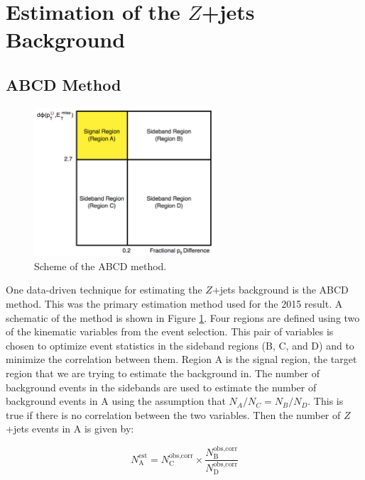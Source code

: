 \section{Estimation of the $Z$+jets Background}
\label{sec:zjets}

\subsection{ABCD Method}

\begin{figure}[htb]
\centering
\includegraphics[width=0.6\textwidth]{Figures/abcd2.png}
\caption{Scheme of the ABCD method.}
\label{fig:abcd}
\end{figure}

One data-driven technique for estimating the $Z$+jets background is the ABCD method. This was the primary estimation method used for the 2015 result. A schematic of the method is shown in Figure \ref{fig:abcd}. Four regions are defined using two of the kinematic variables from the event selection. This pair of variables is chosen to optimize event statistics in the sideband regions (B, C, and D) and to minimize the correlation between them. Region A is the signal region, the target region that we are trying to estimate the background in. The number of background events in the sidebands are used to estimate the number of background events in A using the assumption that $N_A/N_C = N_B/N_D$. This is true if there is no correlation between the two variables. Then the number of $Z$+jets events in A is given by:

\begin{equation}
N_\text{A}^\text{est} = N_\text{C}^\text{obs,corr} \times \frac{N_\text{B}^\text{obs,corr}}{N_\text{D}^\text{obs,corr}}
\end{equation}

